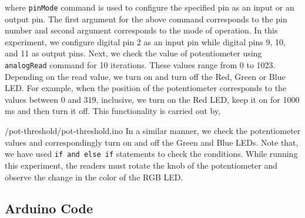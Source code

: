 where {\tt pinMode} command is used to configure the specified pin as
an input or an output pin. The first argument for the above command
corresponds to the pin number and second argument corresponds to the
mode of operation. In this experiment, we configure digital pin 2 as
an input pin while digital pins 9, 10, and 11 as output pins. Next, we
check the value of potentiometer using {\tt analogRead} command for 10
iterations. These values range from 0 to 1023. Depending on the read
value, we turn on and turn off the Red, Green or Blue LED. For
example, when the position of the potentiometer corresponds to the
values between 0 and 319, inclusive, we turn on the Red LED, keep it
on for 1000 ms and then turn it off. This functionality is carried out
by,

                {\LocPotardcode/pot-threshold/pot-threshold.ino}
In a similar manner,
we check the potentiometer values and correspondingly turn on and off
the Green and Blue LEDs. Note that, we have used {\tt if and else if}
statements to check the conditions. While running this experiment, 
the readers must rotate the knob of the potentiometer and observe 
the change in the color of the RGB LED.  

\subsection{Arduino Code}
\lstset{style=mystyle}
\label{sec:pot-arduino-code}

\begin{ardcode}
\label{ard:pot-100}

\end{ardcode}

